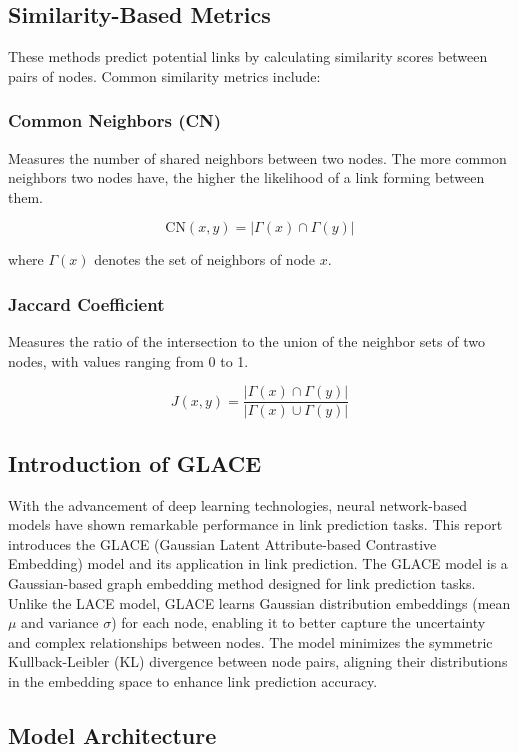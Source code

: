 \documentclass[11pt]{article}
\begin{document}
\subsection{Similarity-Based Metrics}

These methods predict potential links by calculating similarity scores between pairs of nodes. Common similarity metrics include:

\subsubsection{Common Neighbors (CN)}
Measures the number of shared neighbors between two nodes. The more common neighbors two nodes have, the higher the likelihood of a link forming between them.

\[
\text{CN}(x, y) = |\Gamma(x) \cap \Gamma(y)|
\]

where \( \Gamma(x) \) denotes the set of neighbors of node \( x \).

\subsubsection{Jaccard Coefficient}
Measures the ratio of the intersection to the union of the neighbor sets of two nodes, with values ranging from 0 to 1.

\[
J(x, y) = \frac{|\Gamma(x) \cap \Gamma(y)|}{|\Gamma(x) \cup \Gamma(y)|}
\]

\subsection{Introduction of GLACE}
    With the advancement of deep learning technologies, neural network-based models have shown remarkable performance in link prediction tasks. This report introduces the GLACE (Gaussian Latent Attribute-based Contrastive Embedding) model and its application in link prediction. The GLACE model is a Gaussian-based graph embedding method designed for link prediction tasks. Unlike the LACE model, GLACE learns Gaussian distribution embeddings (mean $\mu$ and variance $\sigma$) for each node, enabling it to better capture the uncertainty and complex relationships between nodes. The model minimizes the symmetric Kullback-Leibler (KL) divergence between node pairs, aligning their distributions in the embedding space to enhance link prediction accuracy.

\subsection{Model Architecture}
\end{document}
